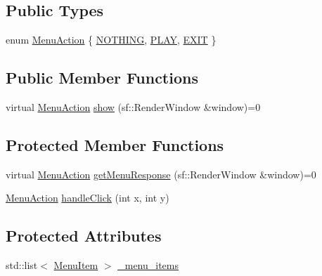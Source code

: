 \subsection*{Public Types}
\begin{DoxyCompactItemize}
\item 
enum \hyperlink{class_menu_a2d708ce8df47ab5feaea1ba559a938d3}{Menu\+Action} \{ \hyperlink{class_menu_a2d708ce8df47ab5feaea1ba559a938d3aedbb0d5fcacdbd60784bd600d7f17763}{N\+O\+T\+H\+I\+N\+G}, 
\hyperlink{class_menu_a2d708ce8df47ab5feaea1ba559a938d3a129e33044e6ab0f6de510d66761d4626}{P\+L\+A\+Y}, 
\hyperlink{class_menu_a2d708ce8df47ab5feaea1ba559a938d3aeb6dc9b046b3581da0ce2c13dd6a329f}{E\+X\+I\+T}
 \}
\end{DoxyCompactItemize}
\subsection*{Public Member Functions}
\begin{DoxyCompactItemize}
\item 
virtual \hyperlink{class_menu_a2d708ce8df47ab5feaea1ba559a938d3}{Menu\+Action} \hyperlink{class_menu_a36605c91aee63d4be6a85b3911a7725b}{show} (sf\+::\+Render\+Window \&window)=0
\end{DoxyCompactItemize}
\subsection*{Protected Member Functions}
\begin{DoxyCompactItemize}
\item 
virtual \hyperlink{class_menu_a2d708ce8df47ab5feaea1ba559a938d3}{Menu\+Action} \hyperlink{class_menu_a445fe4244dc401a85ab8bbaf61373443}{get\+Menu\+Response} (sf\+::\+Render\+Window \&window)=0
\item 
\hyperlink{class_menu_a2d708ce8df47ab5feaea1ba559a938d3}{Menu\+Action} \hyperlink{class_menu_af033e3349e72729ea1b046c0724664d6}{handle\+Click} (int x, int y)
\end{DoxyCompactItemize}
\subsection*{Protected Attributes}
\begin{DoxyCompactItemize}
\item 
std\+::list$<$ \hyperlink{struct_menu_1_1_menu_item}{Menu\+Item} $>$ \hyperlink{class_menu_af5da4e94ca3f406ad7bce76f60b2455d}{\+\_\+menu\+\_\+items}
\end{DoxyCompactItemize}


